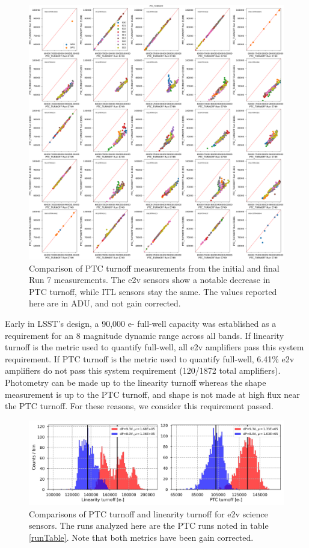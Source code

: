 \begin{figure}[ht]
    \centering
    \includegraphics[width=0.7\linewidth]{figures/finalCharacterization/E749_E1881_PTC_TURNOFF.png}
    \caption{Comparison of PTC turnoff measurements from the initial and final Run 7 measurements. The e2v sensors show a notable decrease in PTC turnoff, while ITL sensors stay the same. The values reported here are in ADU, and not gain corrected.}
    \label{fig:finalChar-PTCTurnoff-5x5}
\end{figure}


Early in LSST's design, a 90,000 e- full-well capacity was established as a requirement for an 8 magnitude dynamic range across all bands\cite{AndyFullWell}. If linearity turnoff is the metric used to quantify full-well, all e2v amplifiers pass this system requirement. If PTC turnoff is the metric used to quantify full-well, 6.41\% e2v amplifiers do not pass this system requirement (120/1872 total amplifiers). Photometry can be made up to the linearity turnoff whereas the shape measurement is up to the PTC turnoff, and shape is not made at high flux near the PTC turnoff. For these reasons, we consider this requirement passed.

\begin{figure}[ht]
    \centering
    \includegraphics[width=0.7\linewidth]{figures/finalCharacterization/fullWellComparisons.jpg}
    \caption{Comparisons of PTC turnoff and linearity turnoff for e2v science sensors. The runs analyzed here are the PTC runs noted in table \ref{runTable}. Note that both metrics have been gain corrected.}
    \label{fig:finalChar-fullWell}
\end{figure}


